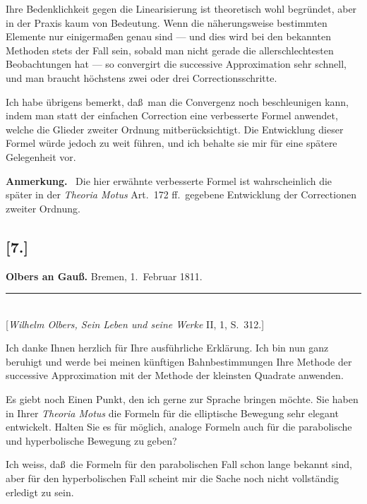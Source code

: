 \documentclass[12pt,a4paper]{article}
\theoremstyle{plain}
\theoremstyle{definition}
\theoremstyle{remark}
\begin{document}
Ihre Bedenklichkeit gegen die Linearisierung ist theoretisch
wohl begr\"undet, aber in der Praxis kaum von Bedeutung. Wenn die
n\"aherungsweise bestimmten Elemente nur einigerma\ss en genau sind
--- und dies wird bei den bekannten Methoden stets der Fall sein,
sobald man nicht gerade die allerschlechtesten Beobachtungen hat ---
so convergirt die successive Approximation sehr schnell, und man
braucht h\"ochstens zwei oder drei Correctionsschritte.

Ich habe \"ubrigens bemerkt, da\ss\ man die Convergenz noch
beschleunigen kann, indem man statt der einfachen Correction eine
verbesserte Formel anwendet, welche die Glieder zweiter Ordnung
mitber\"ucksichtigt. Die Entwicklung dieser Formel w\"urde jedoch zu
weit f\"uhren, und ich behalte sie mir f\"ur eine sp\"atere
Gelegenheit vor.

\medskip

\textbf{Anmerkung.} \ Die hier erw\"ahnte verbesserte Formel ist
wahrscheinlich die sp\"ater in der \textit{Theoria Motus} Art.~172
ff.\ gegebene Entwicklung der Correctionen zweiter Ordnung.


\subsection*{[7.]}
\begin{center}
\textbf{Olbers an Gau\ss.} Bremen, 1.~Februar 1811.
\end{center}
\begin{center}
\rule{6cm}{0.4pt}\\[4pt]
[{\it Wilhelm Olbers, Sein Leben und seine Werke} II, 1, S.~312.]
\end{center}

Ich danke Ihnen herzlich f\"ur Ihre ausf\"uhrliche Erkl\"arung.
Ich bin nun ganz beruhigt und werde bei meinen k\"unftigen
Bahnbestimmungen Ihre Methode der successive Approximation mit der
Methode der kleinsten Quadrate anwenden.

Es giebt noch Einen Punkt, den ich gerne zur Sprache bringen
m\"ochte. Sie haben in Ihrer \textit{Theoria Motus} die Formeln
f\"ur die elliptische Bewegung sehr elegant entwickelt. Halten Sie
es f\"ur m\"oglich, analoge Formeln auch f\"ur die parabolische und
hyperbolische Bewegung zu geben?

Ich weiss, da\ss\ die Formeln f\"ur den parabolischen Fall schon
lange bekannt sind, aber f\"ur den hyperbolischen Fall scheint mir
die Sache noch nicht vollst\"andig erledigt zu sein.
\end{document}
